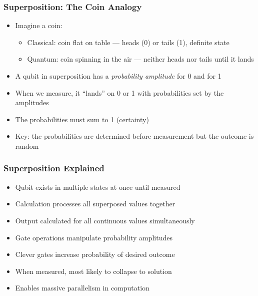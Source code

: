 \begin{frame}[fragile]\frametitle{Superposition: The Coin Analogy}
\begin{itemize}
\item Imagine a coin:
  \begin{itemize}
  \item Classical: coin flat on table --- heads (0) or tails (1), definite state
  \item Quantum: coin spinning in the air --- neither heads nor tails until it lands
  \end{itemize}
\item A qubit in superposition has a \textit{probability amplitude} for 0 and for 1
\item When we measure, it ``lands'' on 0 or 1 with probabilities set by the amplitudes
\item The probabilities must sum to 1 (certainty)
\item Key: the probabilities are determined before measurement but the outcome is random
\end{itemize}
\end{frame}

\begin{frame}[fragile]\frametitle{Superposition Explained}
\begin{itemize}
\item Qubit exists in multiple states at once until measured
\item Calculation processes all superposed values together
\item Output calculated for all continuous values simultaneously
\item Gate operations manipulate probability amplitudes
\item Clever gates increase probability of desired outcome
\item When measured, most likely to collapse to solution
\item Enables massive parallelism in computation
\end{itemize}
\end{frame}

